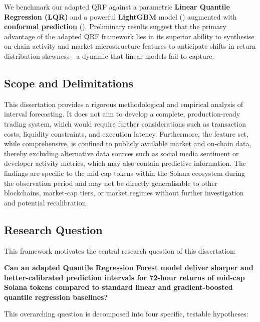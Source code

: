 \documentclass[
  a4paper,
  DIV=11,
  numbers=noendperiod]{scrreprt}
\begin{document}
We benchmark our adapted QRF against a parametric \textbf{Linear
Quantile Regression (LQR)} and a powerful \textbf{LightGBM} model
() augmented with
\textbf{conformal prediction} (). Preliminary results suggest that the
primary advantage of the adapted QRF framework lies in its superior
ability to synthesise on-chain activity and market microstructure
features to anticipate shifts in return distribution skewness---a
dynamic that linear models fail to capture.

\subsection{Scope and Delimitations}\label{scope-and-delimitations}

This dissertation provides a rigorous methodological and empirical
analysis of interval forecasting. It does not aim to develop a complete,
production-ready trading system, which would require further
considerations such as transaction costs, liquidity constraints, and
execution latency. Furthermore, the feature set, while comprehensive, is
confined to publicly available market and on-chain data, thereby
excluding alternative data sources such as social media sentiment or
developer activity metrics, which may also contain predictive
information. The findings are specific to the mid-cap tokens within the
Solana ecosystem during the observation period and may not be directly
generalisable to other blockchains, market-cap tiers, or market regimes
without further investigation and potential recalibration.

\subsection{Research Question}\label{research-question}

This framework motivates the central research question of this
dissertation:

\textbf{Can an adapted Quantile Regression Forest model deliver sharper
and better-calibrated prediction intervals for 72-hour returns of
mid-cap Solana tokens compared to standard linear and gradient-boosted
quantile regression baselines?}

This overarching question is decomposed into four specific, testable
hypotheses:
\end{document}

